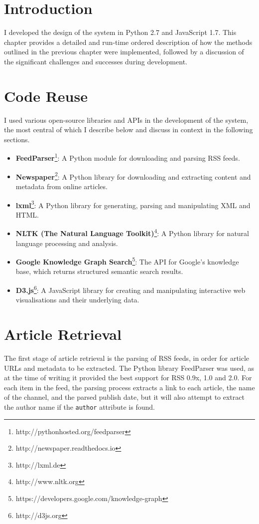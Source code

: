 \section{Introduction}
I developed the design of the system in Python 2.7 and JavaScript 1.7. This chapter provides a detailed and run-time ordered description of how the methods outlined in the previous chapter were implemented, followed by a discussion of the significant challenges and successes during development.

\section{Code Reuse}
I used various open-source libraries and APIs in the development of the system, the most central of which I describe below and discuss in context in the following sections.

\begin{itemize}[noitemsep]
	\item\textbf{FeedParser}\footnote{http://pythonhosted.org/feedparser}: A Python module for downloading and parsing RSS feeds.
	\item\textbf{Newspaper}\footnote{http://newspaper.readthedocs.io}: A Python library for downloading and extracting content and metadata from online articles.
	\item\textbf{lxml}\footnote{http://lxml.de}: A Python library for generating, parsing and manipulating XML and HTML.
	\item\textbf{NLTK (The Natural Language Toolkit)}\footnote{http://www.nltk.org}: A Python library for natural language processing and analysis.
	\item\textbf{Google Knowledge Graph Search}\footnote{https://developers.google.com/knowledge-graph}: The API for Google's knowledge base, which returns structured semantic search results.
	\item\textbf{D3.js}\footnote{http://d3js.org}: A JavaScript library for creating and manipulating interactive web visualisations and their underlying data.
\end{itemize}


\section{Article Retrieval}

The first stage of article retrieval is the parsing of RSS feeds, in order for article URLs and metadata to be extracted. The Python library FeedParser was used, as at the time of writing it provided the best support for RSS 0.9x, 1.0 and 2.0. For each item in the feed, the parsing process extracts a link to each article, the name of the channel, and the parsed publish date, but it will also attempt to extract the author name if the \texttt{author} attribute is found.

